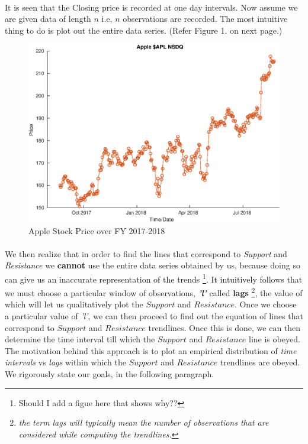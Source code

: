 \documentclass[letterpaper, 12pt] {article}
\begin{document}
	\paragraph{}
	It is seen that the Closing price is recorded at one day intervals. Now assume we are given data of length $n$ i.e, $n$ observations are recorded. The most intuitive thing to do is plot out the entire data series. (Refer Figure 1. on next page.)
	\begin{figure}[h!]
		\centering
		\includegraphics[scale = 0.45]{apple_c_plot_latex_raw}
		\caption{Apple Stock Price over FY 2017-2018}
		\label{Figure 1}
		
	\end{figure}
	
	\paragraph{}
	We then realize that in order to find the lines that correspond to \textit{Support} and \textit{Resistance} we \textbf{cannot} use the entire data series obtained by us, because doing so can give us an inaccurate representation of the trends \footnote{Should I add a figue here that shows why??}. It intuitively follows that we must choose a particular window of observations, \textbf{\textit{'l'}} called \textbf{lags} \footnote{\textit{the term lags will typically mean the number of observations that are considered while computing the trendlines.}}, the value of which will let us qualitatively plot the $Support$ and $Resistance$. Once we choose a particular value of \textit{'l'}, we can then proceed to find out the equation of lines that correspond to $Support$ and $Resistance$ trendlines. Once this is done, we can then determine the time interval till which the $Support$ and $Resistance$ line is obeyed. The motivation behind this approach is to plot an empirical distribution of \textit{time intervals} vs \textit{lags} within which the $Support$ and $Resistance$ trendlines are obeyed. \linebreak
	We rigorously state our goals, in the following paragraph.
	
\end{document}
